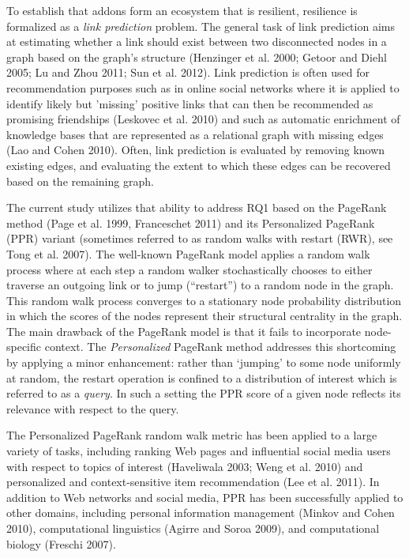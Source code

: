 \documentclass{article} %
\begin{document}
To establish that addons form an ecosystem that is resilient, resilience is formalized as a \textit{link prediction} problem. The general task of link prediction aims at estimating whether a link should exist between two disconnected nodes in a graph based on the graph's structure (Henzinger et al. 2000; Getoor and Diehl 2005; Lu and Zhou 2011; Sun et al. 2012). Link prediction is often used for recommendation purposes such as in online social networks where it is applied to identify likely but 'missing' positive links that can then be recommended as promising friendships (Leskovec et al. 2010) and such as automatic enrichment of knowledge bases that are represented as a relational graph with missing edges (Lao and Cohen 2010). Often, link prediction is evaluated by removing known existing edges, and evaluating the extent to which these edges can be recovered based on the remaining graph. 

The current study utilizes that ability to address RQ1 based on the PageRank method (Page et al. 1999, Franceschet 2011) and its Personalized PageRank (PPR) variant (sometimes referred to as random walks with restart (RWR), see Tong et al. 2007). The well-known PageRank model applies a random walk process where at each step a random walker stochastically chooses to either traverse an outgoing link or to jump (``restart'') to a random node in the graph. This random walk process converges to a stationary node probability distribution in which the scores of the nodes represent their structural centrality in the graph. The main drawback of the PageRank model is that it fails to incorporate node-specific context. The \textit{Personalized} PageRank method addresses this shortcoming by applying a minor enhancement: rather than `jumping' to some node uniformly at random, the restart operation is confined to a distribution of interest which is referred to as a\textit{ query}. In such a setting the PPR score of a given node reflects its relevance with respect to the query.

The Personalized PageRank random walk metric has been applied to a large variety of tasks, including ranking Web pages and influential social media users with respect to topics of interest (Haveliwala 2003; Weng et al. 2010) and personalized and context-sensitive item recommendation (Lee et al. 2011). In addition to Web networks and social media, PPR has been successfully applied to other domains, including personal information management (Minkov and Cohen 2010), computational linguistics (Agirre and Soroa 2009), and computational biology (Freschi 2007).
\end{document}
